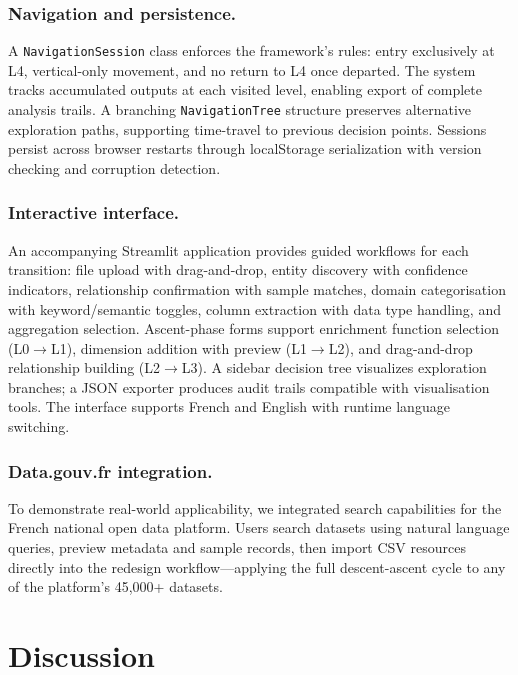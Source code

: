 \documentclass[12pt,a4paper]{article}
\begin{document}
\subsubsection{Navigation and persistence.}
A \texttt{NavigationSession} class enforces the framework's rules: entry exclusively at L4, vertical-only movement, and no return to L4 once departed. The system tracks accumulated outputs at each visited level, enabling export of complete analysis trails. A branching \texttt{NavigationTree} structure preserves alternative exploration paths, supporting time-travel to previous decision points. Sessions persist across browser restarts through localStorage serialization with version checking and corruption detection.


\subsubsection{Interactive interface.}
\noindent An accompanying Streamlit application provides guided workflows for each transition: file upload with drag-and-drop, entity discovery with confidence indicators, relationship confirmation with sample matches, domain categorisation with keyword/semantic toggles, column extraction with data type handling, and aggregation selection. Ascent-phase forms support enrichment function selection (L0$\to$L1), dimension addition with preview (L1$\to$L2), and drag-and-drop relationship building (L2$\to$L3). A sidebar decision tree visualizes exploration branches; a JSON exporter produces audit trails compatible with visualisation tools. The interface supports French and English with runtime language switching.

\subsubsection{Data.gouv.fr integration.}
To demonstrate real-world applicability, we integrated search capabilities for the French national open data platform. Users search datasets using natural language queries, preview metadata and sample records, then import CSV resources directly into the redesign workflow---applying the full descent-ascent cycle to any of the platform's 45,000+ datasets.


\section{Discussion}
\label{sec:discussion}
\end{document}
